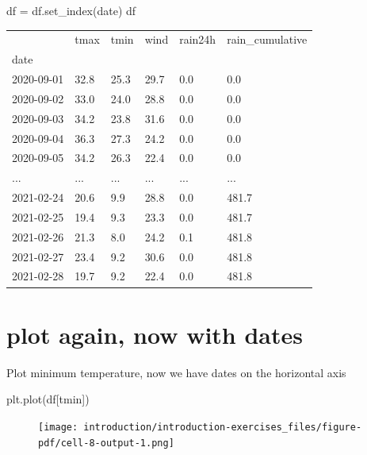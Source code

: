 \documentclass[
  letterpaper,
  DIV=11,
  numbers=noendperiod]{scrreprt}
\newenvironment{Shaded}{\begin{snugshade}}{\end{snugshade}}
\newcommand{\NormalTok}[1]{\textcolor[rgb]{0.00,0.23,0.31}{#1}}
\newcommand{\OperatorTok}[1]{\textcolor[rgb]{0.37,0.37,0.37}{#1}}
\newcommand{\StringTok}[1]{\textcolor[rgb]{0.13,0.47,0.30}{#1}}
\begin{document}
\begin{Shaded}
\begin{Highlighting}[]
\NormalTok{df }\OperatorTok{=}\NormalTok{ df.set\_index(}\StringTok{\textquotesingle{}date\textquotesingle{}}\NormalTok{)}
\NormalTok{df}
\end{Highlighting}
\end{Shaded}

\begin{longtable}[]{@{}llllll@{}}
\toprule()
& tmax & tmin & wind & rain24h & rain\_cumulative \\
date & & & & & \\
\midrule()
\endhead
2020-09-01 & 32.8 & 25.3 & 29.7 & 0.0 & 0.0 \\
2020-09-02 & 33.0 & 24.0 & 28.8 & 0.0 & 0.0 \\
2020-09-03 & 34.2 & 23.8 & 31.6 & 0.0 & 0.0 \\
2020-09-04 & 36.3 & 27.3 & 24.2 & 0.0 & 0.0 \\
2020-09-05 & 34.2 & 26.3 & 22.4 & 0.0 & 0.0 \\
... & ... & ... & ... & ... & ... \\
2021-02-24 & 20.6 & 9.9 & 28.8 & 0.0 & 481.7 \\
2021-02-25 & 19.4 & 9.3 & 23.3 & 0.0 & 481.7 \\
2021-02-26 & 21.3 & 8.0 & 24.2 & 0.1 & 481.8 \\
2021-02-27 & 23.4 & 9.2 & 30.6 & 0.0 & 481.8 \\
2021-02-28 & 19.7 & 9.2 & 22.4 & 0.0 & 481.8 \\
\bottomrule()
\end{longtable}

\hypertarget{plot-again-now-with-dates}{%
\section{plot again, now with dates}\label{plot-again-now-with-dates}}

Plot minimum temperature, now we have dates on the horizontal axis

\begin{Shaded}
\begin{Highlighting}[]
\NormalTok{plt.plot(df[}\StringTok{\textquotesingle{}tmin\textquotesingle{}}\NormalTok{])}
\end{Highlighting}
\end{Shaded}

\begin{figure}[H]

{\centering \texttt{[image: introduction/introduction-exercises\_files/figure-pdf/cell-8-output-1.png]}

}

\end{figure}
\end{document}
